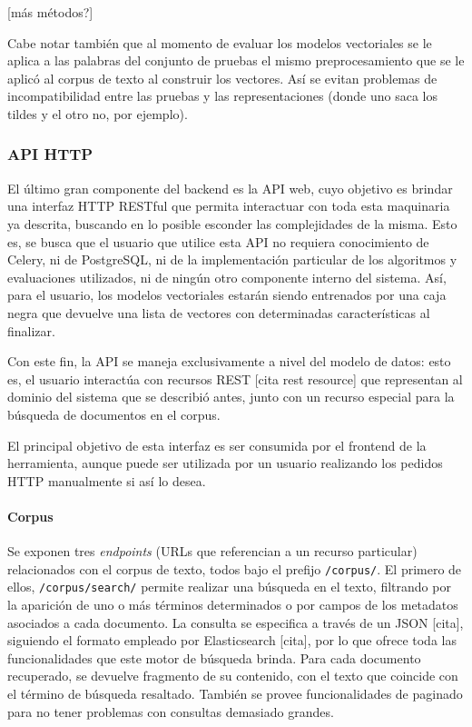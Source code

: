 [más métodos?]

\quad

Cabe notar también que al momento de evaluar los modelos vectoriales se le aplica a las palabras del
conjunto de pruebas el mismo preprocesamiento que se le aplicó al corpus de texto al construir los
vectores. Así se evitan problemas de incompatibilidad entre las pruebas y las representaciones
(donde uno saca los tildes y el otro no, por ejemplo).


\subsubsection{API HTTP}

El último gran componente del backend es la API web, cuyo objetivo es brindar una interfaz HTTP
RESTful que permita interactuar con toda esta maquinaria ya descrita, buscando en lo posible
esconder las complejidades de la misma. Esto es, se busca que el usuario que utilice esta API no
requiera conocimiento de Celery, ni de PostgreSQL, ni de la implementación particular de los
algoritmos y evaluaciones utilizados, ni de ningún otro componente interno del sistema. Así, para el
usuario, los modelos vectoriales estarán siendo entrenados por una caja negra que devuelve una lista
de vectores con determinadas características al finalizar.

Con este fin, la API se maneja exclusivamente a nivel del modelo de datos: esto es, el usuario
interactúa con recursos REST [cita rest resource] que representan al dominio del sistema que se
describió antes, junto con un recurso especial para la búsqueda de documentos en el corpus.

El principal objetivo de esta interfaz es ser consumida por el frontend de la herramienta, aunque
puede ser utilizada por un usuario realizando los pedidos HTTP manualmente si así lo desea.


\paragraph{Corpus}

Se exponen tres \textit{endpoints} (URLs que referencian a un recurso particular) relacionados con
el corpus de texto, todos bajo el prefijo \texttt{/corpus/}. El primero de ellos,
\texttt{/corpus/search/} permite realizar una búsqueda en el texto, filtrando por la aparición de
uno o más términos determinados o por campos de los metadatos asociados a cada documento. La
consulta se especifica a través de un JSON [cita], siguiendo el formato empleado por Elasticsearch
[cita], por lo que ofrece toda las funcionalidades que este motor de búsqueda brinda. Para cada
documento recuperado, se devuelve fragmento de su contenido, con el texto que coincide con el
término de búsqueda resaltado. También se provee funcionalidades de paginado para no tener problemas
con consultas demasiado grandes.

